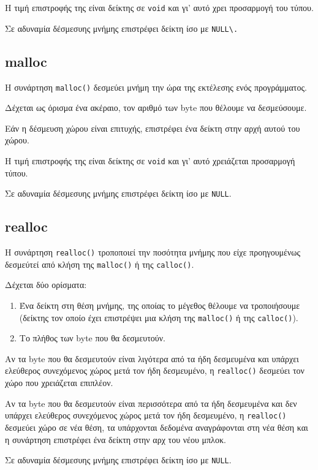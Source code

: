 \documentclass[14pt, fleqn, leqno]{extreport}
\begin{document}
Η τιμή επιστροφής της είναι δείκτης σε \lstinline{void} και γι' αυτό χρει προσαρμογή του τύπου.

Σε αδυναμία δέσμεσυης μνήμης επιστρέφει δείκτη ίσο με \lstinline{NULL\.}

\subsection{malloc}

Η συνάρτηση \lstinline{malloc()} δεσμεύει μνήμη την ώρα της εκτέλεσης ενός προγράμματος.

Δέχεται ως όρισμα ένα ακέραιο, τον αριθμό των byte που θέλουμε να δεσμεύσουμε.

Εάν η δέσμευση χώρου είναι επιτυχής, επιστρέφει ένα δείκτη στην αρχή αυτού του χώρου.

Η τιμή επιστροφής της είναι δείκτης σε \lstinline{void} και γι' αυτό χρειάζεται προσαρμογή τύπου.

Σε αδυναμία δέσμεσυης μνήμης επιστρέφει δείκτη ίσο με \lstinline{NULL}.

\subsection{realloc}

Η συνάρτηση \lstinline{realloc()} τροποποιεί την ποσότητα μνήμης που είχε προηγουμένως δεσμεύτεί από κλήση της \lstinline{malloc()} ή της \lstinline{calloc()}.

Δέχεται δύο ορίσματα:
\begin{enumerate}
    \item Ένα δείκτη στη θέση μνήμης, της οποίας το μέγεθος θέλουμε να τροποιήσουμε (δείκτης τον οποίο έχει επιστρέψει μια κλήση της \lstinline{malloc()} ή της \lstinline{calloc()}).
    \item Το πλήθος των byte που θα δεσμευτούν.
\end{enumerate}

Αν τα byte που θα δεσμευτούν είναι λιγότερα από τα ήδη δεσμευμένα και υπάρχει ελεύθερος συνεχόμενος χώρος μετά τον ήδη δεσμευμένο, η \lstinline{realloc()} δεσμεύει τον χώρο που χρειάζεται επιπλέον.

Αν τα byte που θα δεσμευτούν είναι περισσότερα από τα ήδη δεσμευμένα και δεν υπάρχει ελεύθερος συνεχόμενος χώρος μετά τον ήδη δεσμευμένο, η \lstinline{realloc()} δεσμεύει χώρο σε νέα θέση, τα υπάρχονται δεδομένα αναγράφονται στη νέα θέση και η συνάρτηση επιστρέφει ένα δείκτη στην αρχ του νέου μπλοκ.

Σε αδυναμία δέσμεσυης μνήμης επιστρέφει δείκτη ίσο με \lstinline{NULL}.
\end{document}

